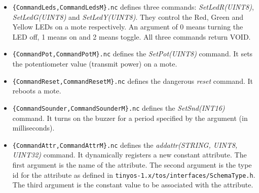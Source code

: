 \documentclass[11pt]{article}
\newcommand{\docroot}{tinyos-1.x}
\begin{document}
\begin{itemize}
\begin{itemize}
\item {\tt \{CommandLeds,CommandLedsM\}.nc} defines three commands:
{\em SetLedR(UINT8)}, {\em SetLedG(UINT8)} and {\em SetLedY(UINT8)}.
They control the Red, Green and Yellow LEDs on a mote respectively.
An argument of 0 means turning the LED off, 1 means on and 2 means toggle.
All three commands return VOID.
\item {\tt \{CommandPot,CommandPotM\}.nc} defines the {\em SetPot(UINT8)}
command.  It sets the potentiometer value (transmit power) on a mote.
\item {\tt \{CommandReset,CommandResetM\}.nc} defines the dangerous
{\em reset} command.  It reboots a mote.
\item {\tt \{CommandSounder,CommandSounderM\}.nc} defines the 
{\em SetSnd(INT16)} command.  It turns on the buzzer for
a period specified by the argument (in milliseconds).
\item {\tt \{CommandAttr,CommandAttrM\}.nc} defines the 
{\em addattr(STRING, UINT8, UINT32)} command.  It dynamically
registers a new constant attribute.  The first argument is the
name of the attribute.  The second argument is the type id for the
attribute as defined in {\tt \docroot/tos/interfaces/SchemaType.h}.
The third argument is the constant value to be associated with the
attribute.
\end{itemize}
\end{itemize}
\end{document}

